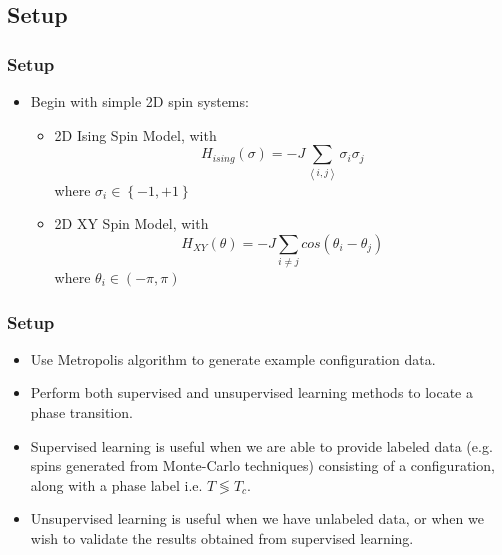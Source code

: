 \documentclass{beamer}
\begin{document}
\subsection{Setup} %
\begin{frame}
\frametitle{Setup}
	\begin{itemize}
		\item Begin with simple 2D spin systems:
				\begin{itemize}
					\item 2D Ising Spin Model, with $$H_{ising}(\sigma) = - J \sum_{\left<i,j\right>} \sigma_i \sigma_j$$
						where $\sigma_{i} \in \left\{-1, +1\right\}$
						\bigskip
					\item 2D XY Spin Model, with $$ H_{XY}(\theta) = - J \sum_{i \ne j} cos\left(\theta_i - \theta_j\right) $$
						where $\theta_{i} \in (-\pi, \pi)$
				\end{itemize}
	\end{itemize}
\end{frame}

\begin{frame}
\frametitle{Setup}
	\begin{itemize}
		\item Use Metropolis algorithm to generate example configuration data.
		\item Perform both supervised and unsupervised learning methods to locate a phase transition.
		\item Supervised learning is useful when we are able to provide labeled data (e.g. spins generated from Monte-Carlo techniques)
			consisting of a configuration, along with a phase label i.e. $T \lessgtr T_{c}$.
		\item Unsupervised learning is useful when we have unlabeled data, or when we wish to validate the results obtained from supervised learning.
	\end{itemize}

\end{frame}
\end{document}
